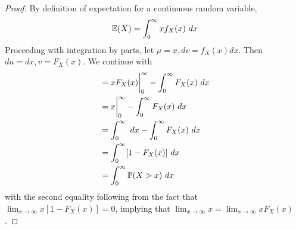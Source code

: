 \documentclass[a4paper]{article}
\begin{document}
\begin{proof}[Proof] 
By definition of expectation for a continuous random variable,
\[
	\mathbb{E}(X) = \int^{\infty}_{0} x f_{X}(x) \ dx 
\]
Proceeding with integration by parts, let \(\mu = x, dv = f_{X}(x) dx\). Then \(du = dx, v = F_{X}(x)\). We continue with
\begin{align*}
	 & = x F_{X}(x) \bigg| ^{\infty}_{0} - \int^{\infty}_{0} F_{X}(x) \ dx  \\
	 & = x \bigg| ^{\infty}_{0} - \int^{\infty}_{0} F_{X}(x) \ dx  \\ 
	 & = \int^{\infty}_{0}  \ dx - \int^{\infty}_{0} F_{X}(x) \ dx \\  
	 & = \int^{\infty}_{0} [1 - F_{X}(x)] \ dx \\
	 & = \int^{\infty}_{0} \Prob(X > x) \ dx 
\end{align*}
with the second equality following from the fact that \(\lim_{x \to \infty} x[1 - F_{X}(x)] = 0\), implying that \(\lim_{x \to \infty} x = \lim_{x \to \infty} x F_{X}(x) \). 
\end{proof}
\end{document}

